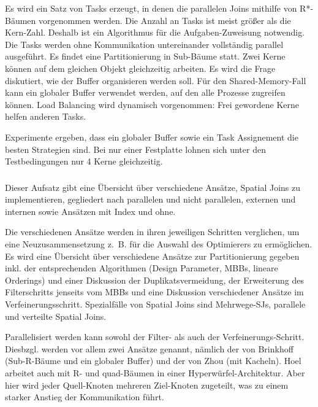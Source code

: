 \documentclass[a4paper,12pt,twoside]{article}
\begin{document}
Es wird ein Satz von Tasks erzeugt, in denen die parallelen Joins mithilfe von R*-Bäumen vorgenommen werden. Die Anzahl an Tasks ist meist größer als die Kern-Zahl. Deshalb ist ein Algorithmus für die Aufgaben-Zuweisung notwendig. Die Tasks werden ohne Kommunikation untereinander vollständig parallel ausgeführt. Es findet eine Partitionierung in Sub-Bäume statt. Zwei Kerne können auf dem gleichen Objekt gleichzeitig arbeiten. Es wird die Frage diskutiert, wie der Buffer organisieren werden soll. Für den Shared-Memory-Fall kann ein globaler Buffer verwendet werden, auf den alle Prozesse zugreifen können. Load Balancing wird dynamisch vorgenommen: Frei gewordene Kerne helfen anderen Tasks.

Experimente ergeben, dass ein globaler Buffer sowie ein Task Assignement die besten Strategien sind. Bei nur einer Festplatte lohnen sich unter den Testbedingungen nur 4 Kerne gleichzeitig. 

\subsubsection*{}

Dieser Aufsatz gibt eine Übersicht über verschiedene Ansätze, Spatial Joins zu implementieren, gegliedert nach parallelen und nicht parallelen, externen und internen sowie Ansätzen mit Index und ohne.

Die verschiedenen Ansätze werden in ihren jeweiligen Schritten verglichen, um eine Neuzusammensetzung z.~B. für die Auswahl des Optimierers zu ermöglichen. Es wird eine Übersicht über verschiedene Ansätze zur Partitionierung gegeben inkl. der entsprechenden Algorithmen (Design Parameter, MBBs, lineare Orderings) und einer Diskussion der Duplikatsvermeidung, der Erweiterung des Filterschritts jenseits vom MBBs und eine Diskussion verschiedener Ansätze im Verfeinerungsschritt. Spezialfälle von Spatial Joins sind Mehrwege-SJs, parallele und verteilte Spatial Joins.

Parallelisiert werden kann sowohl der Filter- als auch der Verfeinerungs-Schritt. Diesbzgl. werden vor allem zwei Ansätze genannt, nämlich der von Brinkhoff (Sub-R-Bäume und ein globaler Buffer) und der von Zhou (mit Kacheln). Hoel arbeitet auch mit R- und quad-Bäumen in einer Hyperwürfel-Architektur. Aber hier wird jeder Quell-Knoten mehreren Ziel-Knoten zugeteilt, was zu einem starker Anstieg der Kommunikation führt.

\subsubsection*{}
\end{document}
